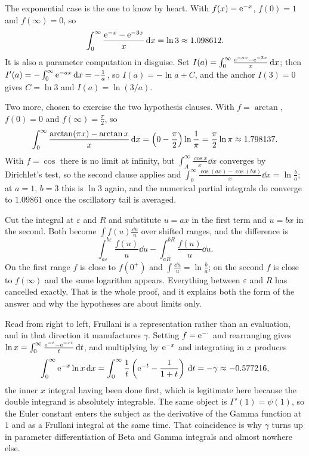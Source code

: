 \begin{worked}
The exponential case is the one to know by heart. With $f(x)=\mathrm{e}^{-x}$, $f(0)=1$ and $f(\infty)=0$, so
\[\int_0^{\infty}\frac{\mathrm{e}^{-x}-\mathrm{e}^{-3x}}{x}\,\mathrm{d} x=\ln3\approx1.098612.\]
It is also a parameter computation in disguise. Set $I(a)=\int_0^\infty\frac{\mathrm{e}^{-ax}-\mathrm{e}^{-3x}}{x}\,\mathrm{d} x$; then $I'(a)=-\int_0^\infty \mathrm{e}^{-ax}\,\mathrm{d} x=-\tfrac1a$, so $I(a)=-\ln a+C$, and the anchor $I(3)=0$ gives $C=\ln3$ and $I(a)=\ln(3/a)$.

Two more, chosen to exercise the two hypothesis clauses. With $f=\arctan$, $f(0)=0$ and $f(\infty)=\tfrac{\pi}{2}$, so
\[\int_0^{\infty}\frac{\arctan(\pi x)-\arctan x}{x}\,\mathrm{d} x=\Bigl(0-\frac{\pi}{2}\Bigr)\ln\frac{1}{\pi}=\frac{\pi}{2}\ln\pi\approx1.798137.\]
With $f=\cos$ there is no limit at infinity, but $\int_A^\infty\frac{\cos x}{x}\dd x$ converges by Dirichlet's test, so the second clause applies and $\int_0^\infty\frac{\cos(ax)-\cos(bx)}{x}\dd x=\ln\frac{b}{a}$; at $a=1$, $b=3$ this is $\ln3$ again, and the numerical partial integrals do converge to $1.09861$ once the oscillatory tail is averaged.
\end{worked}

\begin{keynote}
Cut the integral at $\varepsilon$ and $R$ and substitute $u=ax$ in the first term and $u=bx$ in the second. Both become $\int f(u)\frac{\dd u}{u}$ over shifted ranges, and the difference is
\[\int_{a\varepsilon}^{b\varepsilon}\frac{f(u)}{u}\dd u-\int_{aR}^{bR}\frac{f(u)}{u}\dd u.\]
On the first range $f$ is close to $f(0^{+})$ and $\int\frac{\dd u}{u}=\ln\frac{b}{a}$; on the second $f$ is close to $f(\infty)$ and the same logarithm appears. Everything between $\varepsilon$ and $R$ has cancelled exactly. That is the whole proof, and it explains both the form of the answer and why the hypotheses are about limits only.
\end{keynote}

Read from right to left, Frullani is a representation rather than an evaluation, and in that direction it manufactures $\gamma$. Setting $f=\mathrm{e}^{-\cdot}$ and rearranging gives $\ln x=\int_0^{\infty}\frac{\mathrm{e}^{-t}-\mathrm{e}^{-xt}}{t}\,\mathrm{d} t$, and multiplying by $\mathrm{e}^{-x}$ and integrating in $x$ produces
\[\int_0^{\infty}\mathrm{e}^{-x}\ln x\,\mathrm{d} x=\int_0^{\infty}\frac{1}{t}\left(\mathrm{e}^{-t}-\frac{1}{1+t}\right)\,\mathrm{d} t=-\gamma\approx-0.577216,\]
the inner $x$ integral having been done first, which is legitimate here because the double integrand is absolutely integrable. The same object is $\Gamma'(1)=\psi(1)$, so the Euler constant enters the subject as the derivative of the Gamma function at $1$ and as a Frullani integral at the same time. That coincidence is why $\gamma$ turns up in parameter differentiation of Beta and Gamma integrals and almost nowhere else.

